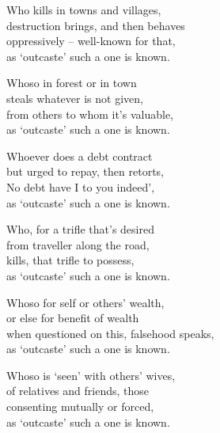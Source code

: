 \begin{MyDescription}{}
Who kills in towns and villages,\\
destruction brings, and then behaves\\
oppressively – well-known for that,\\
as `outcaste' such a one is known.
\end{MyDescription}

\begin{MyDescription}{}
Whoso in forest or in town\\
steals whatever is not given,\\
from others to whom it's valuable,\\
as `outcaste' such a one is known.
\end{MyDescription}
   
\begin{MyDescription}{}
Whoever does a debt contract\\
but urged to repay, then retorts,\\
No debt have I to you indeed',\\
as `outcaste' such a one is known.
\end{MyDescription}

\begin{MyDescription}{}
Who, for a trifle that's desired\\
from traveller along the road,\\
kills, that trifle to possess,\\
as `outcaste' such a one is known.
\end{MyDescription}

\begin{MyDescription}{}
Whoso for self or others' wealth,\\
or else for benefit of wealth\\
when questioned on this, falsehood speaks,\\
as `outcaste' such a one is known.
\end{MyDescription}   
   
\begin{MyDescription}{}
Whoso is `seen' with others' wives,\\
of relatives and friends, those\\
consenting mutually or forced,\\
as `outcaste' such a one is known.
\end{MyDescription}   

